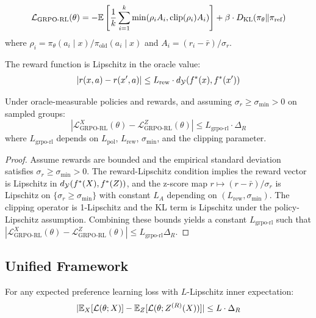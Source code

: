 \begin{definition}
\[
\mathcal{L}_{\text{GRPO-RL}}(\theta) = -\mathbb{E}\left[\frac{1}{k}\sum_{i=1}^k \min(\rho_i A_i, \text{clip}(\rho_i) A_i)\right] + \beta \cdot D_{\text{KL}}(\pi_\theta \| \pi_{\text{ref}})
\]
where $\rho_i = \pi_\theta(a_i \mid x) / \pi_{\text{old}}(a_i \mid x)$ and $A_i = (r_i - \bar{r})/\sigma_r$.
\end{definition}

\begin{assumption}
The reward function is Lipschitz in the oracle value:
\[
|r(x, a) - r(x', a)| \le L_{\text{rew}} \cdot d_{\mathcal{Y}}(f^{\ast}(x), f^{\ast}(x'))
\]
\end{assumption}

\begin{theorem}
Under oracle-measurable policies and rewards, and assuming $\sigma_r \ge \sigma_{\min} > 0$ on sampled groups:
\[
|\mathcal{L}^X_{\text{GRPO-RL}}(\theta) - \mathcal{L}^Z_{\text{GRPO-RL}}(\theta)| \le L_{\text{grpo-rl}} \cdot \Delta_R
\]
where $L_{\text{grpo-rl}}$ depends on $L_{\text{pol}}$, $L_{\text{rew}}$, $\sigma_{\min}$, and the clipping parameter.
\end{theorem}

\begin{proof}
Assume rewards are bounded and the empirical standard deviation satisfies $\sigma_r\ge\sigma_{\min}>0$. The reward-Lipschitz condition implies the reward vector is Lipschitz in $d_{\mathcal{Y}}(f^{\ast}(X),f^{\ast}(Z))$, and the z-score map $r\mapsto(r-\bar r)/\sigma_r$ is Lipschitz on $\{\sigma_r\ge\sigma_{\min}\}$ with constant $L_A$ depending on $(L_{\text{rew}},\sigma_{\min})$. The clipping operator is 1-Lipschitz and the KL term is Lipschitz under the policy-Lipschitz assumption. Combining these bounds yields a constant $L_{\text{grpo-rl}}$ such that
$|\mathcal{L}^X_{\text{GRPO-RL}}(\theta)-\mathcal{L}^Z_{\text{GRPO-RL}}(\theta)|\le L_{\text{grpo-rl}}\Delta_R$.
\end{proof}

\subsection{Unified Framework}

\begin{theorem}\label{app:thm:unified-gap}
For any expected preference learning loss with $L$-Lipschitz inner expectation:
\[
|\mathbb{E}_X[\mathcal{L}(\theta; X)] - \mathbb{E}_Z[\mathcal{L}(\theta; Z^{(R)}(X))]| \le L \cdot \Delta_R
\]
\end{theorem}

